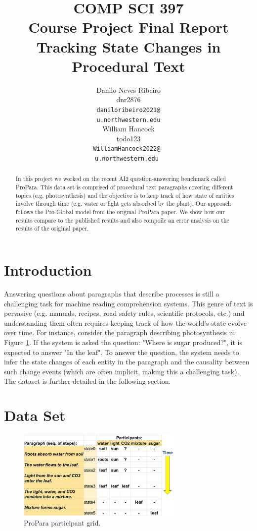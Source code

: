 \documentclass[11pt,a4paper]{article}
\title{COMP SCI 397 \\
    Course Project Final Report \\
    Tracking State Changes in Procedural Text}
\author{Danilo Neves Ribeiro \\
  dnr2876 \\
  {\tt daniloribeiro2021@} \\
  {\tt u.northwestern.edu} \\\And
  William Hancock \\
  todo123 \\
  {\tt WilliamHancock2022@ } \\
  {\tt u.northwestern.edu } \\}
\date{}
\begin{document}
\maketitle
\begin{abstract}
  In this project we worked on the recent AI2 question-answering 
  benchmark called ProPara. This data set is comprised of procedural 
  text paragraphs covering different topics (e.g. photosynthesis) and 
  the objective is to keep track of how state of entities involve through 
  time (e.g. water or light gets absorbed by the plant). Our approach 
  follows the Pro-Global model from the original ProPara paper. We 
  show how our results compare to the published results and also 
  compoile an error analysis on the results of the original paper.
\end{abstract}

\section{Introduction}

Answering questions about paragraphs that describe processes is still 
a challenging task for machine reading comprehension systems. This 
genre of text is pervasive (e.g. manuals, recipes, road safety rules, 
scientific protocols, etc.) and understanding them often requires 
keeping track of how the world’s state evolve over time. For instance, 
consider the paragraph describing photosynthesis in Figure 
\ref{fig:participant-grid}. If the system is asked the question: 
"Where is sugar produced?", it is expected to answer "In the leaf". 
To answer the question, the system needs to infer the state changes 
of each entity in the paragraph and the causality between such change 
events (which are often implicit, making this a challenging task). The 
dataset is further detailed in the following section.

\section{Data Set}

\begin{figure}[h]
\includegraphics[width=8cm]{participant-grid-simple.JPG}
\caption{ProPara participant grid.}
\label{fig:participant-grid}
\end{figure}
\end{document}
